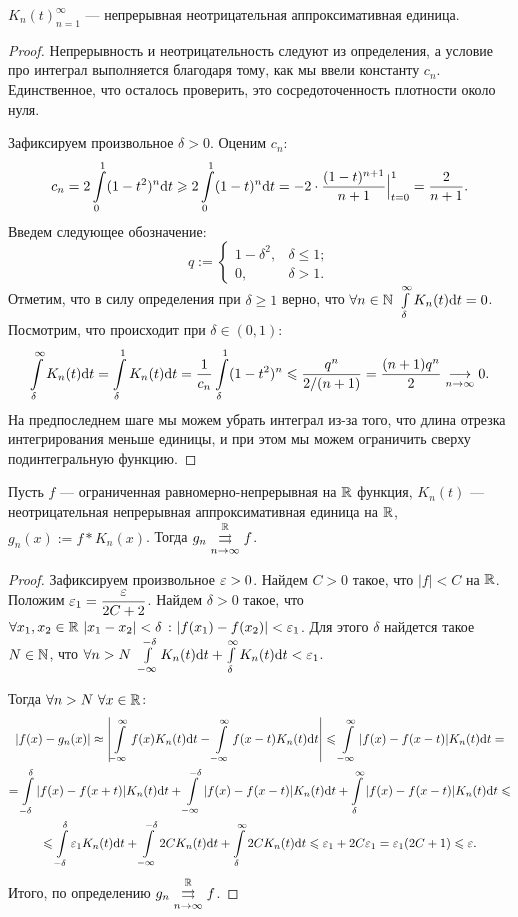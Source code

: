 \begin{Lemma}\label{lemma1}
${K_n(t)}_{n = 1}^{\infty}$ --- непрерывная неотрицательная аппроксимативная единица.
\end{Lemma}
\begin{proof}
Непрерывность и неотрицательность следуют из определения, а условие про интеграл выполняется благодаря тому, как мы ввели константу $c_n$. Единственное, что осталось проверить, это сосредоточенность плотности около нуля.

Зафиксируем произвольное $\delta > 0$. Оценим $c_n$:
$$
c_n = 2 \int\limits_{0}^{1}(1 - t^2)^n \mathrm{d} t \geqslant 2 \int\limits_{0}^{1}(1 - t)^n\mathrm{d} t = -2 \cdot\dfrac{(1 - t)^{n + 1}}{n+1}\Big|_{t=0}^{1} = \dfrac{2}{n + 1}.
$$
Введем следующее обозначение:
$$
q := \begin{cases}
1 - \delta^2, & \delta \leq 1;\\
0, & \delta > 1.
\end{cases}
$$
Отметим, что в силу определения при $\delta \geq 1$ верно, что $\forall n \in \N \ \int\limits_{\delta}^{\infty}K_n(t)\d t = 0$. Посмотрим, что происходит при $\delta \in (0, 1)$:
$$
\int\limits_{\delta}^{\infty}K_n(t)\mathrm{d} t = \int\limits_{\delta}^1 K_n(t)\mathrm{d} t = \dfrac{1}{c_n}\int\limits_{\delta}^{1}(1 - t^2)^n \leqslant \dfrac{q^n}{2/(n + 1)} = \dfrac{(n + 1)q^n}{2} \underset{n\to \infty}{\longrightarrow} 0.
$$
На предпоследнем шаге мы можем убрать интеграл из-за того, что длина отрезка интегрирования меньше единицы, и при этом мы можем ограничить сверху подинтегральную функцию.
\end{proof}

\begin{Lemma}
Пусть $f$ --- ограниченная равномерно-непрерывная на $\mathbb{R}$ функция, $K_n(t)$ --- неотрицательная непрерывная аппроксимативная единица на $\mathbb{R}$, $g_n(x):= f * K_n(x)$. Тогда $g_n \overset{\mathbb{R}}{\underset{n \to \infty}{\rightrightarrows}} f$.
\end{Lemma}
\begin{proof}
Зафиксируем произвольное $\varepsilon > 0$. Найдем $C > 0$ такое, что $|f| < C$ на $\mathbb{R}$. Положим $\varepsilon_1 = \dfrac{\varepsilon}{2C + 2}$. Найдем $\delta > 0$ такое, что $\forall x_1, x_2 \in \mathbb{R}\  |x_1 - x_2| < \delta \ \colon |f(x_1) - f(x_2)| < \varepsilon_1$. Для этого $\delta$ найдется такое $N \in \mathbb{N}$, что $\forall n > N\ \int\limits_{-\infty}^{-\delta}K_n(t)\d t + \int\limits_{\delta}^{\infty}K_n(t) \d t < \eps_1$.

Тогда $\forall n > N\ \forall x \in \mathbb{R}$:
\begin{gather*}
|f(x) - g_n(x)| \approx \left| \int\limits_{-\infty}^{\infty}f(x)K_n(t)\mathrm{d} t - \int\limits_{-\infty}^{\infty}f(x - t)K_n(t)\mathrm{d} t \right| \leqslant \int\limits_{-\infty}^{\infty}|f(x) - f(x - t)|K_n(t)\mathrm{d} t = \\
= \int\limits_{-\delta}^{\delta}|f(x) - f(x + t)| K_n(t)\mathrm{d} t + \int\limits_{-\infty}^{-\delta} |f(x) - f(x - t)|K_n(t)\mathrm{d} t + \int\limits_{\delta}^{\infty} |f(x) - f(x - t)|K_n(t)\mathrm{d} t \leqslant \\
\leqslant \int\limits_{-\delta}^{\delta}\varepsilon_1 K_n(t)\mathrm{d} t + \int\limits_{-\infty}^{-\delta}2C K_n(t) \mathrm{d} t + \int\limits_{\delta}^{\infty}2C K_n(t) \mathrm{d} t \leqslant \varepsilon_1 + 2C\varepsilon_1 = \varepsilon_1(2C + 1) \leqslant \varepsilon.
\end{gather*}
Итого, по определению $g_n \overset{\mathbb{R}}{\underset{n \to \infty}{\rightrightarrows}} f$.
\end{proof}

